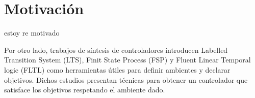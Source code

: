 \section{Motivación}

estoy re motivado

Por otro lado, trabajos de síntesis de controladores introducen Labelled Transition System (LTS), Finit State Process (FSP) y Fluent Linear Temporal logic (FLTL) como herramientas útiles para definir ambientes y declarar objetivos. Dichos estudios presentan técnicas para obtener un controlador que satisface los objetivos respetando el ambiente dado.  
